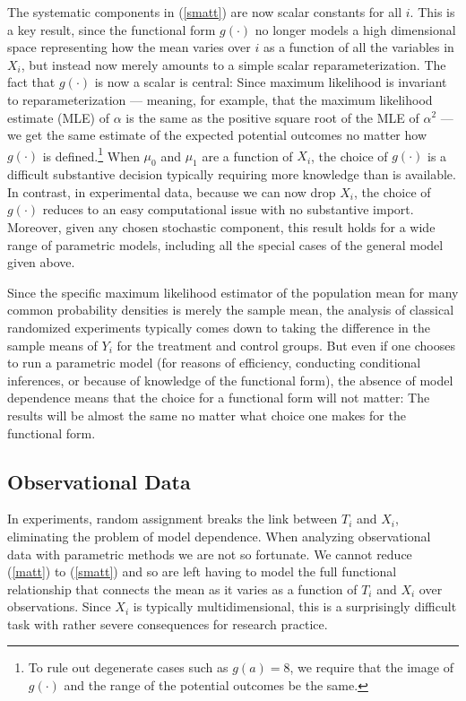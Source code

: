 \documentclass[11pt,titlepage]{article}
\begin{document}
The systematic components in (\ref{smatt}) are now scalar constants
for all $i$.  This is a key result, since the functional form
$g(\cdot)$ no longer models a high dimensional space representing how
the mean varies over $i$ as a function of all the variables in $X_i$,
but instead now merely amounts to a simple scalar reparameterization.
The fact that $g(\cdot)$ is now a scalar is central: Since maximum
likelihood is invariant to reparameterization --- meaning, for
example, that the maximum likelihood estimate (MLE) of $\alpha$ is the
same as the positive square root of the MLE of $\alpha^2$ \citep[][p.
75--76]{King89} --- we get the same estimate of the expected potential
outcomes no matter how $g(\cdot)$ is defined.\footnote{To rule out
  degenerate cases such as $g(a)=8$, we require that the image of
  $g(\cdot)$ and the range of the potential outcomes be the same.}
When $\mu_0$ and $\mu_1$ are a function of $X_i$, the choice of
$g(\cdot)$ is a difficult substantive decision typically requiring
more knowledge than is available.  In contrast, in experimental data,
because we can now drop $X_i$, the choice of $g(\cdot)$ reduces to an
easy computational issue with no substantive import.  Moreover, given
any chosen stochastic component, this result holds for a wide range of
parametric models, including all the special cases of the general
model given above.

Since the specific maximum likelihood estimator of the population mean
for many common probability densities is merely the sample mean, the
analysis of classical randomized experiments typically comes down to
taking the difference in the sample means of $Y_i$ for the treatment
and control groups.  But even if one chooses to run a parametric model
(for reasons of efficiency, conducting conditional inferences, or
because of knowledge of the functional form), the absence of model
dependence means that the choice for a functional form will not
matter: The results will be almost the same no matter what choice one
makes for the functional form.

\subsection{Observational Data} \label{s:paraobs}

In experiments, random assignment breaks the link between $T_i$ and
$X_i$, eliminating the problem of model dependence.
When analyzing observational data with parametric methods we are not
so fortunate.  We cannot reduce (\ref{matt}) to (\ref{smatt}) and so
are left having to model the full functional relationship that
connects the mean as it varies as a function of $T_i$ and $X_i$ over
observations.  Since $X_i$ is typically multidimensional, this is a
surprisingly difficult task with rather severe consequences for
research practice.
\end{document}
